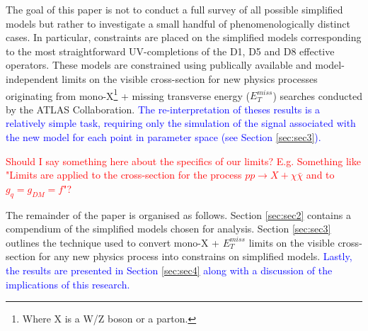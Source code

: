 \begin{flushleft}
\hspace{1cm}The goal of this paper is not to conduct a full survey of all possible simplified models but rather to investigate a small handful of phenomenologically distinct cases. In particular, constraints are placed on the simplified models corresponding to the most straightforward UV-completions of the D1, D5 and D8 effective operators. %
These models are constrained using publically available and model-independent limits on the visible cross-section for new physics processes originating from mono-X\footnote{Where X is a W/Z boson or a parton.} + missing transverse energy ($E_{T}^{miss}$) searches conducted by the ATLAS Collaboration.  \textcolor{blue}{The re-interpretation of theses results is a relatively simple task, requiring only the simulation of the signal associated with the new model for each point in parameter space (see Section \ref{sec:sec3}).}

\hspace{1cm}\textcolor{red}{Should I say something here about the specifics of our limits? E.g. Something like "Limits are applied to the cross-section for the process $pp \rightarrow X + \chi\bar{\chi}$ and to $g_{q} = g_{DM} = f$"?}

\hspace{1cm}The remainder of the paper is organised as follows. Section \ref{sec:sec2} contains a compendium of the simplified models chosen for analysis. Section \ref{sec:sec3} outlines the technique used to convert mono-X + $E_{T}^{miss}$ limits on the visible cross-section for any new physics process into constrains on simplified models. \textcolor{blue}{Lastly, the results are presented in Section \ref{sec:sec4} along with a discussion of the implications of this research.}
\bigskip


\end{flushleft}
